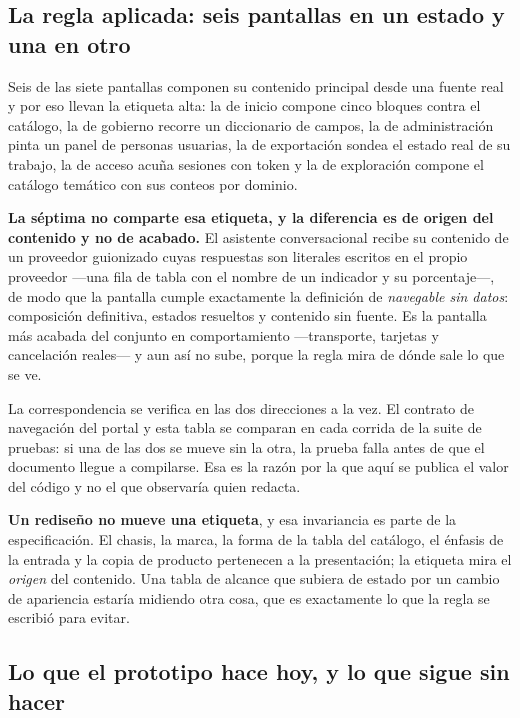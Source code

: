 \subsection{La regla aplicada: seis pantallas en un estado y una en otro}

Seis de las siete pantallas componen su contenido principal desde una fuente real y por eso llevan
la etiqueta alta: la de inicio compone cinco bloques contra el catálogo, la de gobierno recorre un
diccionario de campos, la de administración pinta un panel de personas usuarias, la de exportación
sondea el estado real de su trabajo, la de acceso acuña sesiones con token y la de exploración
compone el catálogo temático con sus conteos por dominio.

\textbf{La séptima no comparte esa etiqueta, y la diferencia es de origen del contenido y no de
acabado.} El asistente conversacional recibe su contenido de un proveedor guionizado cuyas
respuestas son literales escritos en el propio proveedor ---una fila de tabla con el nombre de un
indicador y su porcentaje---, de modo que la pantalla cumple exactamente la definición de
\emph{navegable sin datos}: composición definitiva, estados resueltos y contenido sin fuente. Es la
pantalla más acabada del conjunto en comportamiento ---transporte, tarjetas y cancelación reales---
y aun así no sube, porque la regla mira de dónde sale lo que se ve.

La correspondencia se verifica en las dos direcciones a la vez. El contrato de navegación del
portal y esta tabla se comparan en cada corrida de la suite de pruebas: si una de las dos se mueve
sin la otra, la prueba falla antes de que el documento llegue a compilarse. Esa es la razón por la
que aquí se publica el valor del código y no el que observaría quien redacta.

\textbf{Un rediseño no mueve una etiqueta}, y esa invariancia es parte de la especificación. El
chasis, la marca, la forma de la tabla del catálogo, el énfasis de la entrada y la copia de producto
pertenecen a la presentación; la etiqueta mira el \emph{origen} del contenido. Una tabla de alcance
que subiera de estado por un cambio de apariencia estaría midiendo otra cosa, que es exactamente lo
que la regla se escribió para evitar.

\subsection{Lo que el prototipo hace hoy, y lo que sigue sin hacer}

